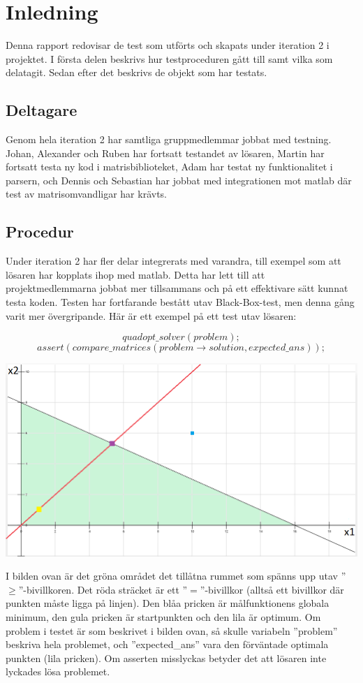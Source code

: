 \section{Inledning}
Denna rapport redovisar de test som utförts och skapats under iteration 2 i projektet. I första delen beskrivs hur testproceduren gått till samt vilka som delatagit. Sedan efter det beskrivs de objekt som har testats.
\subsection{Deltagare}
Genom hela iteration 2 har samtliga gruppmedlemmar jobbat med testning. Johan, Alexander och Ruben har fortsatt testandet av lösaren, Martin har fortsatt testa ny kod i matrisbiblioteket, Adam har testat ny funktionalitet i parsern, och Dennis och Sebastian har jobbat med integrationen mot matlab där test av matrisomvandligar har krävts. 

\subsection{Procedur}
Under iteration 2 har fler delar integrerats med varandra, till exempel som att lösaren har kopplats ihop med matlab. Detta har lett till att projektmedlemmarna jobbat mer tillsammans och på ett effektivare sätt kunnat testa koden. Testen har fortfarande bestått utav Black-Box-test, men denna gång varit mer övergripande. Här är ett exempel på ett test utav lösaren:

$$quadopt\_solver(problem);$$
$$assert(compare\_matrices(problem\rightarrow solution, expected\_ans));$$

\includegraphics[scale=0.6]{prob.png}


\raggedright I bilden ovan är det gröna området det tillåtna rummet som spänns upp utav ''$\geq$''-bivillkoren. Det röda sträcket är ett ''$=$''-bivillkor (alltså ett bivillkor där punkten måste ligga på linjen). Den blåa pricken är målfunktionens globala minimum, den gula pricken är startpunkten och den lila är optimum. \newline
Om problem i testet är som beskrivet i bilden ovan, så skulle variabeln ''problem'' beskriva hela problemet, och ''expected\_ans'' vara den förväntade optimala punkten (lila pricken). Om asserten misslyckas betyder det att lösaren inte lyckades lösa problemet.

